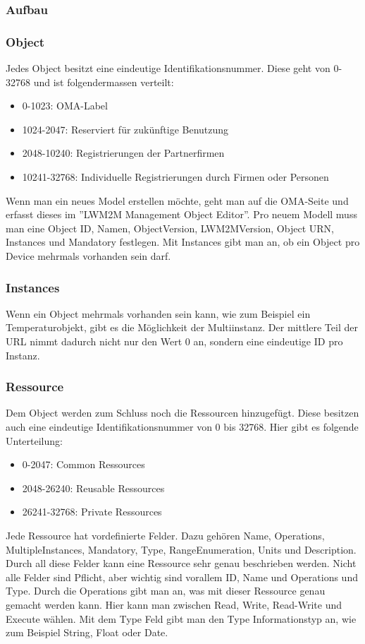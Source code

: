 \subsubsection{Aufbau}
\subsubsection{Object}
Jedes Object besitzt eine eindeutige Identifikationsnummer. Diese geht von 0-32768 und ist folgendermassen verteilt:
\begin{itemize}
\item 0-1023: OMA-Label
\item 1024-2047: Reserviert für zukünftige Benutzung
\item 2048-10240: Registrierungen der Partnerfirmen
\item 10241-32768: Individuelle Registrierungen durch Firmen oder Personen
\end{itemize}
Wenn man ein neues Model erstellen möchte, geht man auf die OMA-Seite und erfasst dieses im ''LWM2M Management Object Editor''. Pro neuem Modell muss man eine Object ID, Namen, ObjectVersion, LWM2MVersion, Object URN, Instances und Mandatory festlegen. Mit Instances gibt man an, ob ein Object pro Device mehrmals vorhanden sein darf.
\subsubsection{Instances}
Wenn ein Object mehrmals vorhanden sein kann, wie zum Beispiel ein Temperaturobjekt, gibt es die Möglichkeit der Multiinstanz. Der mittlere Teil der URL nimmt dadurch nicht nur den Wert 0 an, sondern eine eindeutige ID pro Instanz.

\subsubsection{Ressource}
Dem Object werden zum Schluss noch die Ressourcen hinzugefügt. Diese besitzen auch eine eindeutige Identifikationsnummer von 0 bis 32768. Hier gibt es folgende Unterteilung:
\begin{itemize}
\item 0-2047: Common Ressources
\item 2048-26240: Reusable Ressources
\item 26241-32768: Private Ressources
\end{itemize}
Jede Ressource hat vordefinierte Felder. Dazu gehören Name, Operations, MultipleInstances, Mandatory, Type, RangeEnumeration, Units und Description. Durch all diese Felder kann eine Ressource sehr genau beschrieben werden. Nicht alle Felder sind Pflicht, aber wichtig sind vorallem ID, Name und Operations und Type. Durch die Operations gibt man an, was mit dieser Ressource genau gemacht werden kann. Hier kann man zwischen Read, Write, Read-Write und Execute wählen.	Mit dem Type Feld gibt man den Type Informationstyp an, wie zum Beispiel String, Float oder Date.


